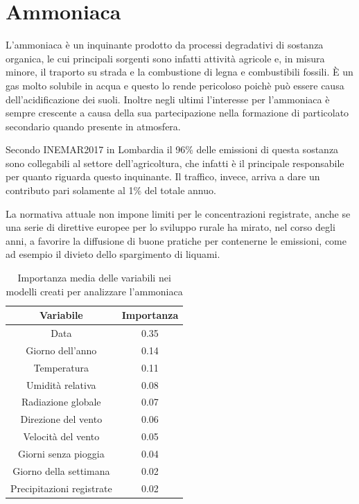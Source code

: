 \documentclass[a4paper,12pt]{report}
\begin{document}
\section{Ammoniaca}
L'ammoniaca è un inquinante prodotto da processi degradativi di sostanza organica, le cui principali sorgenti sono infatti attività agricole e, in misura minore, il traporto su strada e la combustione di legna e combustibili fossili. È un gas molto solubile in acqua e questo lo rende pericoloso poichè può essere causa dell'acidificazione dei suoli. Inoltre negli ultimi l'interesse per l'ammoniaca è sempre crescente a causa della sua partecipazione nella formazione di particolato secondario quando presente in atmosfera.

Secondo INEMAR2017 in Lombardia il 96\% delle emissioni di questa sostanza sono collegabili al settore dell'agricoltura, che infatti è il principale responsabile per quanto riguarda questo inquinante. Il traffico, invece, arriva a dare un contributo pari solamente al 1\% del totale annuo.

La normativa attuale non impone limiti per le concentrazioni registrate, anche se una serie di direttive europee per lo sviluppo rurale ha mirato, nel corso degli anni, a favorire la diffusione di buone pratiche per contenerne le emissioni, come ad esempio il divieto dello spargimento di liquami. 

\begin{table}[h!]
\centering
\begin{tabular}{ |c c| }
	\hline
	Variabile & Importanza \\
	\hline
	Data & 0.35 \\
	Giorno dell'anno & 0.14 \\
	Temperatura & 0.11 \\
	Umidità relativa & 0.08 \\
	Radiazione globale & 0.07 \\
	Direzione del vento & 0.06 \\
	Velocità del vento & 0.05 \\
	Giorni senza pioggia & 0.04 \\
	Giorno della settimana & 0.02 \\
	Precipitazioni registrate & 0.02 \\
	\hline
\end{tabular}
\caption{Importanza media delle variabili nei modelli creati per analizzare l'ammoniaca}
\label{table:importanza_ammoniaca}
\end{table}
\end{document}

